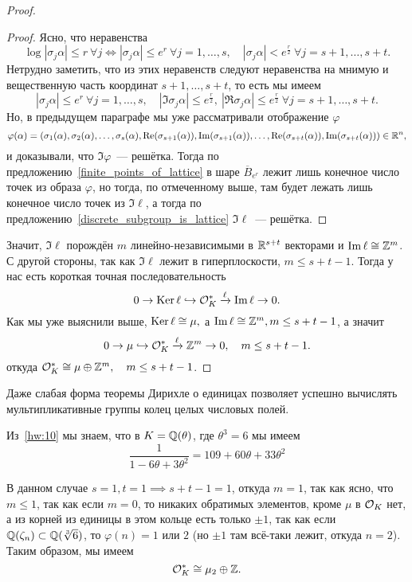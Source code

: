 \begin{proof}
\begin{proof}
			Ясно, что неравенства
			\[
				\log|\sigma_{j}\alpha| \le r \ \forall j \Leftrightarrow |\sigma_{j}\alpha| \le e^{r} \ \forall j = 1, \ldots, s, \quad |\sigma_{j}\alpha| < e^{\frac{r}{2}} \ \forall j = s + 1,\ldots, s + t.
			\]
			Нетрудно заметить, что из этих неравенств следуют неравенства на мнимую и вещественную часть координат $s + 1, \ldots, s + t$, то есть мы имеем
			\[
				|\sigma_{j}\alpha| \le e^{r} \ \forall j = 1, \ldots, s, \quad |\Im\sigma_{j}\alpha| \le  e^{\frac{r}{2}}, \ |\Re\sigma_{j}\alpha| \le  e^{\frac{r}{2}} \ \forall j = s + 1,\ldots, s + t.
			\]
			Но, в предыдущем параграфе мы уже рассматривали отображение $\varphi$
			\[	  	
				\varphi(\alpha) = (\sigma_1(\alpha), \sigma_2(\alpha), \ldots, \sigma_s(\alpha), \mathop{\mathrm{Re}}\nolimits(\sigma_{s + 1}(\alpha)), \mathop{\mathrm{Im}}\nolimits(\sigma_{s + 1}(\alpha)),  \ldots, \mathop{\mathrm{Re}}\nolimits(\sigma_{s + t}(\alpha)), \mathop{\mathrm{Im}}\nolimits(\sigma_{s + t}(\alpha))) \in \mathbb{R}^n,
			\]
			и доказывали, что $\Im{\varphi}$~--- решётка. Тогда по предложению~\ref{finite_points_of_lattice} в шаре $\overline{B}_{e^{r}}$  лежит лишь конечное число точек из образа $\varphi$, но тогда, по отмеченному выше, там будет лежать лишь конечное число точек из $\Im{\ell}$, а тогда по предложению~\ref{discrete_subgroup_is_lattice} $\Im{\ell}$~--- решётка. 
		\end{proof}

		Значит, $\Im{\ell}$ порождён $m$ линейно-независимыми в $\mathbb{R}^{s + t}$ векторами и  $\mathop{\mathrm{Im}}\nolimits{\ell} \cong \mathbb{Z}^{m}$. С другой стороны, так как $\Im{\ell}$ лежит в гиперплоскости, $m \le s + t - 1$.  Тогда у нас есть короткая точная последовательность 
		\[
		 	0 \to \operatorname{Ker}{\ell} \hookrightarrow \mathcal{O}_{K}^{*} \xrightarrow{\ell} \mathop{\mathrm{Im}}\nolimits{\ell} \to 0.
		 \] 
		 Как мы уже выяснили выше, $\operatorname{Ker}{\ell} \cong \mu,$ а $\mathop{\mathrm{Im}}\nolimits{\ell} \cong \mathbb{Z}^{m}, m \le s + t - 1$, а значит 
		 \[
		 	0 \to \mu \hookrightarrow \mathcal{O}_{K}^{*}  \xrightarrow{\ell} \mathbb{Z}^{m} \to 0, \quad m \le s + t - 1. 
		 \]
		 откуда $\mathcal{O}_{K}^{*} \cong \mu \oplus \mathbb{Z}^{m}, \quad m \le s + t - 1$. 
	\end{proof}

	Даже слабая форма теоремы Дирихле о единицах позволяет успешно вычислять мультипликативные группы колец целых числовых полей. 

	\begin{example}
		Из~\ref{hw:10} мы знаем, что в $K = \mathbb{Q}(\theta)$, где $\theta^3 = 6$ мы имеем
		\[ \frac{1}{1 - 6 \theta + 3\theta^2} = 109 + 60\theta + 33\theta^2 \]

		В данном случае $s = 1, t = 1 \implies s + t - 1 = 1$, откуда $m = 1$, так как ясно, что $m \le 1$, так как если $m = 0$, то никаких обратимых элементов, кроме $\mu$ в $\mathcal{O}_{K}$ нет, а из корней из единицы в этом кольце есть только $\pm 1$, так как  если $\mathbb{Q}(\zeta_n) \subset \mathbb{Q}(\sqrt[3]{6})$, то $\varphi(n) = 1$ или $2$ (но $\pm 1$ там всё-таки лежит, откуда $n = 2$). Таким образом, мы имеем 
		\[
			\mathcal{O}_{K}^* \cong \mu_{2} \oplus \mathbb{Z}.
		\]
	\end{example}

